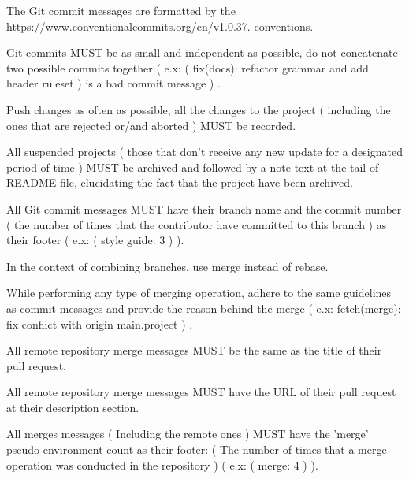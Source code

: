 \documentclass[13pt]{scrarticle}
\newcommand{\nexusrule}[1]{\Tribar[1][white][yellow][red]\color{blue} #1}
\begin{document}
      \nexusrule{ The Git commit messages are formatted by the https://www.conventionalcommits.org/en/v1.0.37. conventions.} \newline

      \nexusrule{ Git commits MUST be as small and independent as possible, do not concatenate two possible commits together ( e.x: ( fix(docs): refactor grammar and add header ruleset ) is a bad commit message ) .} \newline

      \nexusrule{ Push changes as often as possible, all the changes to the project ( including the ones that are rejected or/and aborted ) MUST be recorded.} \newline

      \nexusrule{ All suspended projects ( those that don't receive any new update for a designated period of time ) MUST be archived and followed by a note text at the tail of README file, elucidating the fact that the project have been archived.} \newline

      \nexusrule{ All Git commit messages MUST have their branch name and the commit number ( the number of times that the contributor have committed to this branch ) as their footer ( e.x: ( style guide: 3 ) ).} \newline

      \nexusrule{ In the context of combining branches, use merge instead of rebase.} \newline

      \nexusrule{ While performing any type of merging operation, adhere to the same guidelines as commit messages and provide the reason behind the merge ( e.x: fetch(merge): fix conflict with origin main.project ) .} \newline

      \nexusrule{ All remote repository merge messages MUST be the same as the title of their pull request.} \newline

      \nexusrule{ All remote repository merge messages MUST have the URL of their pull request at their description section.} \newline

      \nexusrule{ All merges messages ( Including the remote ones ) MUST have the 'merge' pseudo-environment count as their footer: ( The number of times that a merge operation was conducted in the repository ) ( e.x: ( merge: 4 ) ).} \newline
\end{document}
